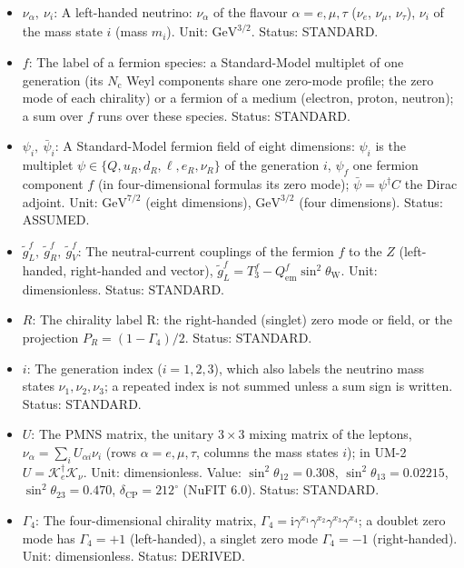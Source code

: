 \documentclass[
  10pt,
]{article}
\begin{document}
\begin{itemize}
  \(\beta\): A second flavour index running over \(e, \mu, \tau\).
  Status: STANDARD.
\item
  \(\nu_\alpha,\ \nu_i\): A left-handed neutrino: \(\nu_\alpha\) of the
  flavour \(\alpha = e, \mu, \tau\) (\(\nu_e\), \(\nu_\mu\),
  \(\nu_\tau\)), \(\nu_i\) of the mass state \(i\) (mass \(m_i\)). Unit:
  \(\mathrm{GeV}^{3/2}\). Status: STANDARD.
\item
  \(f\): The label of a fermion species: a Standard-Model multiplet of
  one generation (its \(N_{\mathrm{c}}\) Weyl components share one
  zero-mode profile; the zero mode of each chirality) or a fermion of a
  medium (electron, proton, neutron); a sum over \(f\) runs over these
  species. Status: STANDARD.
\item
  \(\psi_i,\ \bar\psi_i\): A Standard-Model fermion field of eight
  dimensions: \(\psi_i\) is the multiplet
  \(\psi \in \{Q, u_R, d_R, \ell, e_R, \nu_R\}\) of the generation
  \(i\), \(\psi_f\) one fermion component \(f\) (in four-dimensional
  formulas its zero mode); \(\bar\psi = \psi^\dagger C\) the Dirac
  adjoint. Unit: \(\mathrm{GeV}^{7/2}\) (eight dimensions),
  \(\mathrm{GeV}^{3/2}\) (four dimensions). Status: ASSUMED.
\item
  \(\tilde g^f_L,\ \tilde g^f_R,\ \tilde g^f_V\): The neutral-current
  couplings of the fermion \(f\) to the \(Z\) (left-handed, right-handed
  and vector),
  \(\tilde g^f_L = T_3^f - Q^f_{\mathrm{em}}\sin^2\theta_{\mathrm{W}}\).
  Unit: dimensionless. Status: STANDARD.
\item
  \(R\): The chirality label R: the right-handed (singlet) zero mode or
  field, or the projection \(P_R = (1 - \Gamma_4)/2\). Status: STANDARD.
\item
  \(i\): The generation index (\(i = 1, 2, 3\)), which also labels the
  neutrino mass states \(\nu_1, \nu_2, \nu_3\); a repeated index is not
  summed unless a sum sign is written. Status: STANDARD.
\item
  \(U\): The PMNS matrix, the unitary \(3 \times 3\) mixing matrix of
  the leptons, \(\nu_\alpha = \sum_iU_{\alpha i}\nu_i\) (rows
  \(\alpha = e, \mu, \tau\), columns the mass states \(i\)); in UM-2
  \(U = \mathcal{K}_e^\dagger\mathcal{K}_\nu\). Unit: dimensionless.
  Value: \(\sin^2\theta_{12} = 0.308\), \(\sin^2\theta_{13} = 0.02215\),
  \(\sin^2\theta_{23} = 0.470\), \(\delta_{\mathrm{CP}} = 212^\circ\)
  (NuFIT 6.0). Status: STANDARD.
\item
  \(\Gamma_4\): The four-dimensional chirality matrix,
  \(\Gamma_4 = \mathrm{i}\gamma^{x_1}\gamma^{x_2}\gamma^{x_3}\gamma^{x_4}\);
  a doublet zero mode has \(\Gamma_4 = +1\) (left-handed), a singlet
  zero mode \(\Gamma_4 = -1\) (right-handed). Unit: dimensionless.
  Status: DERIVED.
\end{itemize}
\end{document}
